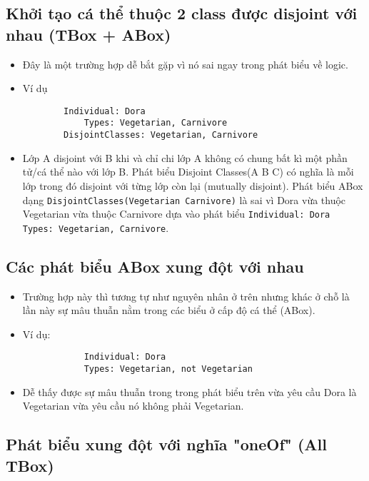 \subsection{Khởi tạo cá thể thuộc 2 class được disjoint với nhau (TBox + ABox)}
\begin{itemize}
\item
Đây là một trường hợp dễ bắt gặp vì nó sai ngay trong phát biểu về logic.
\item Ví dụ
\begin{verbatim}
		Individual: Dora
			Types: Vegetarian, Carnivore
		DisjointClasses: Vegetarian, Carnivore
\end{verbatim}
\item
Lớp A disjoint với B khi và chỉ chi lớp A không có chung bất kì một phần tử/cá thể nào với lớp B. Phát biểu Disjoint Classes(A B C) có nghĩa là mỗi lớp trong đó disjoint với từng lớp còn lại (mutually disjoint). Phát biểu ABox dạng \texttt{DisjointClasses(Vegetarian Carnivore)} là sai vì Dora vừa thuộc Vegetarian vừa thuộc Carnivore dựa vào phát biểu \texttt{Individual: Dora Types: Vegetarian, Carnivore}.
\end{itemize}  	
\subsection{Các phát biểu ABox xung đột với nhau}
\begin{itemize} 
\item{Trường hợp này thì tương tự như nguyên nhân ở trên nhưng khác ở chỗ là lần này sự mâu thuẫn nằm trong các biểu ở cấp độ cá thể (ABox).}
\item{Ví dụ:	
\begin{verbatim}
			Individual: Dora
  			Types: Vegetarian, not Vegetarian
\end{verbatim}
}
\item{Dễ thấy được sự mâu thuẫn trong trong phát biểu trên vừa yêu cầu Dora là Vegetarian vừa yêu cầu nó không phải Vegetarian.}
\end{itemize}
\subsection{Phát biểu xung đột với nghĩa "oneOf" (All TBox)}

